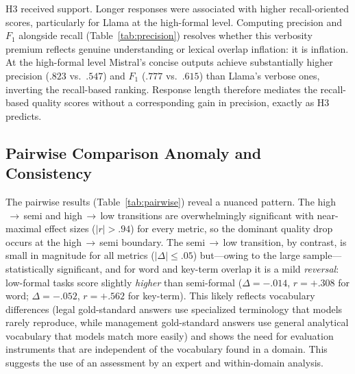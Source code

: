 \documentclass[runningheads]{llncs}
\begin{document}

H3 received support. Longer responses were associated with higher recall-oriented scores, particularly for Llama at the high-formal level. Computing precision and $F_1$ alongside recall (Table~\ref{tab:precision}) resolves whether this verbosity premium reflects genuine understanding or lexical overlap inflation: it is inflation. At the high-formal level Mistral's concise outputs achieve substantially higher precision ($.823$ vs.\ $.547$) and $F_1$ ($.777$ vs.\ $.615$) than Llama's verbose ones, inverting the recall-based ranking. Response length therefore mediates the recall-based quality scores without a corresponding gain in precision, exactly as H3 predicts.

\subsection{Pairwise Comparison Anomaly and Consistency}

The pairwise results (Table~\ref{tab:pairwise}) reveal a nuanced pattern. The high$\,\to\,$semi and high$\,\to\,$low transitions are overwhelmingly significant with near-maximal effect sizes ($|r| > .94$) for every metric, so the dominant quality drop occurs at the high$\,\to\,$semi boundary. The semi$\,\to\,$low transition, by contrast, is small in magnitude for all metrics ($|\Delta| \leq .05$) but---owing to the large sample---statistically significant, and for word and key-term overlap it is a mild \emph{reversal}: low-formal tasks score slightly \emph{higher} than semi-formal ($\Delta = -.014$, $r = +.308$ for word; $\Delta = -.052$, $r = +.562$ for key-term). This likely reflects vocabulary differences (legal gold-standard answers use specialized terminology that models rarely reproduce, while management gold-standard answers use general analytical vocabulary that models match more easily) and shows the need for evaluation instruments that are independent of the vocabulary found in a domain.
This suggests the use of an assessment by an expert and within-domain analysis.
\end{document}
